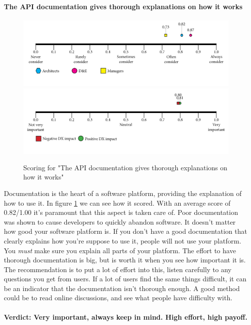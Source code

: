 \documentclass{article}
\begin{document}
\paragraph{The API documentation gives thorough explanations on how it works}
\begin{figure}[H]
\centering
\includegraphics[width=\linewidth]{scorelines/aspect3.png}
\includegraphics[width=\linewidth]{dxscorelines/dxaspect3.png}
\caption{Scoring for "The API documentation gives thorough explanations on how it works"}
\label{fig:aspect3}
\end{figure}
Documentation is the heart of a software platform, providing the explanation of how to use it. In figure \ref{fig:aspect3} we can see how it scored. With an average score of 0.82/1.00 it's paramount that this aspect is taken care of. Poor documentation was shown to cause developers to quickly abandon software. It doesn't matter how good your software platform is. If you don't have a good documentation that clearly explains how you're suppose to use it, people will not use your platform. You \textit{must} make sure you explain all parts of your platform. The effort to have thorough documentation is big, but is worth it when you see how important it is. The recommendation is to put a lot of effort into this, listen carefully to any questions you get from users. If a lot of users find the same things difficult, it can be an indicator that the documentation isn't thorough enough. A good method could be to read online discussions, and see what people have difficulty with.\\ \\
\textbf{Verdict: Very important, always keep in mind. High effort, high payoff.}
\end{document}
